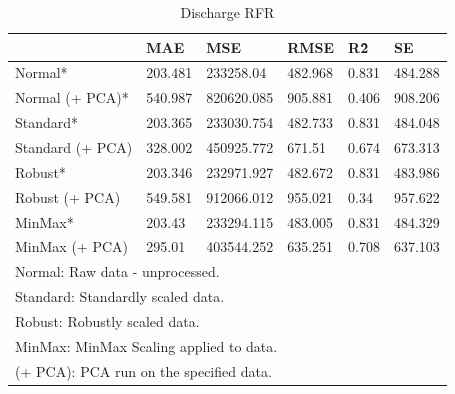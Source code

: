 \documentclass[conference]{IEEEtran}
\begin{document}
\begin{table}[H]
    \centering
    \caption{Discharge RFR}
    \begin{adjustbox}{width=\columnwidth,center}
    \begin{tabular}{llllll}
        ~ & MAE & MSE & RMSE & R\^2 & SE \\  \hline
        Normal* & 203.481 & 233258.04 & 482.968 & 0.831 & 484.288 \\ 
        Normal (+ PCA)* & 540.987 & 820620.085 & 905.881 & 0.406 & 908.206 \\ 
        Standard* & 203.365 & 233030.754 & 482.733 & 0.831 & 484.048 \\
        Standard (+ PCA) & 328.002 & 450925.772 & 671.51 & 0.674 & 673.313 \\ 
        Robust*  & 203.346 & 232971.927 & 482.672 & 0.831 & 483.986 \\ 
        Robust (+ PCA) & 549.581 & 912066.012 & 955.021 & 0.34 & 957.622 \\ 
        MinMax* & 203.43 & 233294.115 & 483.005 & 0.831 & 484.329 \\ 
        MinMax (+ PCA) & 295.01 & 403544.252 & 635.251 & 0.708 & 637.103 \\ 
        \bottomrule
        \multicolumn{6}{l}{\footnotesize *Normal: Raw data - unprocessed.}\\
        \multicolumn{6}{l}{\footnotesize *Standard: Standardly scaled data.}\\
        \multicolumn{6}{l}{\footnotesize *Robust: Robustly scaled data.}\\
        \multicolumn{6}{l}{\footnotesize *MinMax: MinMax Scaling applied to data.}\\
        \multicolumn{6}{l}{\footnotesize *(+ PCA): PCA run on the specified data.}\\
    \end{tabular}
    \end{adjustbox}
\end{table}
\end{document}
